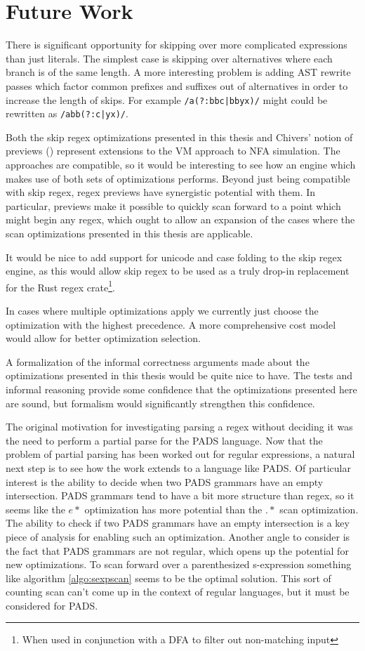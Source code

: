 \chapter{Future Work}
\label{chapter:futurework}

There is significant opportunity for skipping over more complicated
expressions than just literals. The simplest case is skipping over
alternatives where each branch is of the same length. A more interesting
problem is adding AST rewrite passes which factor common prefixes and
suffixes out of alternatives in order to increase the length of skips.
For example \verb'/a(?:bbc|bbyx)/' might could be rewritten as
\verb'/abb(?:c|yx)/'.

Both the skip regex optimizations presented in this thesis and
Chivers' notion of previews (\cite{Chivers2016}) represent
extensions to the VM approach to NFA simulation. The approaches
are compatible, so it would be interesting to see how an engine
which makes use of both sets of optimizations performs. Beyond
just being compatible with skip regex, regex previews have
synergistic potential with them. In particular, previews make
it possible to quickly scan forward to a point which might begin
any regex, which ought to allow an expansion of the cases where
the scan optimizations presented in this thesis are applicable.

It would be nice to add support for unicode and case folding to
the skip regex engine, as this would allow skip regex to be used
as a truly drop-in replacement for the Rust regex crate\footnote{
When used in conjunction with a DFA to filter out non-matching
input}.

In cases where multiple optimizations apply we currently just
choose the optimization with the highest precedence. A more comprehensive
cost model would allow for better optimization selection.

A formalization of the informal correctness arguments made about
the optimizations presented in this thesis would be quite nice
to have. The tests and informal reasoning provide some confidence
that the optimizations presented here are sound, but formalism
would significantly strengthen this confidence.

The original motivation for investigating parsing a regex without
deciding it was the need to perform a partial parse for the PADS
language. Now that the problem of partial parsing has been worked
out for regular expressions, a natural next step is to see how
the work extends to a language like PADS. Of particular interest
is the ability to decide when two PADS grammars have an empty
intersection. PADS grammars tend to have a bit more structure
than regex, so it seems like the $e*$ optimization has more
potential than the $.*$ scan optimization. The ability to check
if two PADS grammars have an empty intersection is a key piece
of analysis for enabling such an optimization. Another angle
to consider is the fact that PADS grammars are not regular,
which opens up the potential for new optimizations. To scan
forward over a parenthesized s-expression something like
algorithm \ref{algo:sexpscan} seems to be the
optimal solution. This sort of counting scan can't come up
in the context of regular languages, but it must be considered for PADS.

